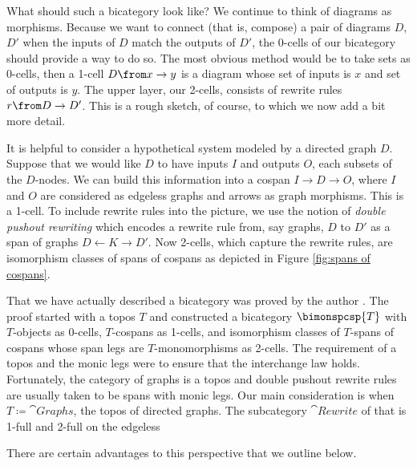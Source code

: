 \documentclass[./Catfying_zxCalc--Master.tex]{subfiles} %
\begin{document}
What should such a bicategory look like? We continue to think of diagrams as morphisms. Because we want to connect (that is, compose) a pair of diagrams $D$, $D'$ when the inputs of $D$ match the outputs of $D'$, the 0-cells of our bicategory should provide a way to do so.  The most obvious method would be to take sets as 0-cells, then a 1-cell $D \from x \to y$ is a diagram whose set of inputs is $x$ and set of outputs is $y$. The upper layer, our 2-cells, consists of rewrite rules $r \from D \to D'$.  This is a rough sketch, of course, to which we now add a bit more detail.

It is helpful to consider a hypothetical system modeled by a directed graph $D$. Suppose that we would like $D$ to have inputs $I$ and outputs $O$, each subsets of the $D$-nodes.  We can build this information into a cospan $I \to D \to O$, where $I$ and $O$ are considered as edgeless graphs and arrows as graph morphisms.  This is a 1-cell.  To include rewrite rules into the picture, we use the notion of \emph{double pushout rewriting}
\cite{Corradini_AlgApprGraphTrans} 
which encodes a rewrite rule from, say graphs, $D$ to $D'$ as a span of graphs $D \gets K \to D'$. Now 2-cells, which capture the rewrite rules, are isomorphism classes of spans of cospans as depicted in Figure \ref{fig:spans of cospans}.  

That we have actually described a bicategory was proved by the author \cite{Cicala_SpansCospans}.  The proof started with a topos $T$ and constructed a bicategory $\bimonspcsp{T}$ with $T$-objects as 0-cells, $T$-cospans as 1-cells, and isomorphism classes of $T$-spans of cospans whose span legs are $T$-monomorphisms as 2-cells.  The requirement of a topos and the monic legs were to ensure that the interchange law holds.  Fortunately, the category of graphs is a topos and double pushout rewrite rules are usually taken to be spans with monic legs. Our main consideration is when $T \coloneqq \cat{Graphs}$, the topos of directed graphs.  The subcategory $\cat{Rewrite}$ of  that is 1-full and 2-full on the edgeless 

There are certain advantages to this perspective that we outline below. 
\end{document}
